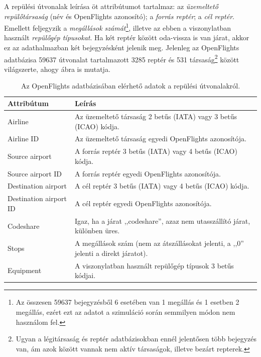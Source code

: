     A repülési útvonalak leírása öt attribútumot tartalmaz: az \textit{üzemeltető repülőtársaság} (név és OpenFlights azonosító); a \textit{forrás reptér}; a \textit{cél reptér}. Emellett feljegyzik a \textit{megállások számát}\footnote{Az összesen 59637 bejegyzésből 6 esetében van 1 megállás és 1 esetben 2 megállás, ezért ezt az adatot a szimuláció során semmilyen módon nem használom fel.}, illetve az ebben a viszonylatban használt \textit{repülőgép típusokat}. Ha két reptér között oda-vissza is van járat, akkor ez az adathalmazban két bejegyzésként jelenik meg. Jelenleg az OpenFlights adatbázisa 59637 útvonalat tartalmazott 3285 reptér és 531 társaság\footnote{Ugyan a légitársaság és reptér adatbázisokban ennél jelentősen több bejegyzés van, ám azok között vannak nem aktív társaságok, illetve bezárt repterek.} között világszerte, ahogy  ábra is mutatja.

    \begin{table}[ht]
      \footnotesize
      \centering
      \begin{tabular}{ | l | l |}
      \hline
      Attribútum & Leírás \\ \hline
      Airline & Az üzemeltető társaság 2 betűs (IATA) vagy 3 betűs (ICAO) kódja.\\
      Airline ID & Az üzemeltető társaság egyedi OpenFlights azonosítója.\\
      Source airport & A forrás reptér 3 betűs (IATA) vagy 4 betűs (ICAO) kódja.\\
      Source airport ID & A forrás reptér egyedi OpenFlights azonosítója.\\
      Destination airport & A cél reptér 3 betűs (IATA) vagy 4 betűs (ICAO) kódja.\\
      Destination airport ID & A cél reptér egyedi OpenFlights azonosítója.\\
      Codeshare & Igaz, ha a járat ,,codeshare'', azaz nem utasszállító járat, különben üres.\\
      Stops & A megállások szám (nem az átszállásokat jelenti, a ,,0'' jelenti a direkt járatot).\\
      Equipment & A viszonylatban használt repülőgép típusok 3 betűs kódjai.\\
      \hline
      \end{tabular}
      \caption{Az OpenFlights adatbázisában elérhető adatok a repülési útvonalakról.}
      \label{tab:table_repulesiutvonalak}
    \end{table}

